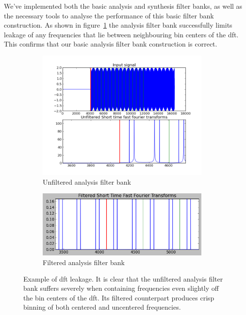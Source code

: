 \documentclass[a4paper,10pt]{article}
\begin{document}
We've implemented both the basic analysis and synthesis filter banks, as well as the necessary tools to analyse the performance of this basic filter bank construction. As shown in 
figure~\ref{filtered_and_unfiltered_analysis} the analysis filter bank successfully limits leakage of any frequencies that lie between neighbouring bin centers of the \gls{dft}.
This confirms that our basic analysis filter bank construction is correct.
\begin{figure}[h]
 \begin{subfigure}{0.5\textwidth}
  \includegraphics[width=0.95\textwidth]{unfiltered.png}
  \caption{Unfiltered analysis filter bank}
 \end{subfigure}
 \begin{subfigure}{0.5\textwidth}
  \includegraphics[width=0.95\textwidth]{filtered.png}
  \caption{Filtered analysis filter bank}
 \end{subfigure}
\caption[\gls{dft} Leakage]{Example of \gls{dft} leakage. It is clear that the unfiltered analysis filter bank suffers severely when containing frequencies even slightly off the bin centers
	 of the \gls{dft}. Its filtered counterpart produces crisp binning of both centered and uncentered frequencies.}
\label{filtered_and_unfiltered_analysis}
\end{figure}
\end{document}
